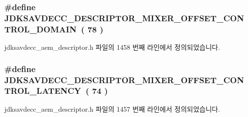 \subsubsection[{\texorpdfstring{J\+D\+K\+S\+A\+V\+D\+E\+C\+C\+\_\+\+D\+E\+S\+C\+R\+I\+P\+T\+O\+R\+\_\+\+M\+I\+X\+E\+R\+\_\+\+O\+F\+F\+S\+E\+T\+\_\+\+C\+O\+N\+T\+R\+O\+L\+\_\+\+D\+O\+M\+A\+IN}{JDKSAVDECC_DESCRIPTOR_MIXER_OFFSET_CONTROL_DOMAIN}}]{\setlength{\rightskip}{0pt plus 5cm}\#define J\+D\+K\+S\+A\+V\+D\+E\+C\+C\+\_\+\+D\+E\+S\+C\+R\+I\+P\+T\+O\+R\+\_\+\+M\+I\+X\+E\+R\+\_\+\+O\+F\+F\+S\+E\+T\+\_\+\+C\+O\+N\+T\+R\+O\+L\+\_\+\+D\+O\+M\+A\+IN~( 78 )}\hypertarget{group__descriptor__mixer_gab0c4900f10973ad3bf6349cea6b6a62e}{}\label{group__descriptor__mixer_gab0c4900f10973ad3bf6349cea6b6a62e}


jdksavdecc\+\_\+aem\+\_\+descriptor.\+h 파일의 1458 번째 라인에서 정의되었습니다.

\subsubsection[{\texorpdfstring{J\+D\+K\+S\+A\+V\+D\+E\+C\+C\+\_\+\+D\+E\+S\+C\+R\+I\+P\+T\+O\+R\+\_\+\+M\+I\+X\+E\+R\+\_\+\+O\+F\+F\+S\+E\+T\+\_\+\+C\+O\+N\+T\+R\+O\+L\+\_\+\+L\+A\+T\+E\+N\+CY}{JDKSAVDECC_DESCRIPTOR_MIXER_OFFSET_CONTROL_LATENCY}}]{\setlength{\rightskip}{0pt plus 5cm}\#define J\+D\+K\+S\+A\+V\+D\+E\+C\+C\+\_\+\+D\+E\+S\+C\+R\+I\+P\+T\+O\+R\+\_\+\+M\+I\+X\+E\+R\+\_\+\+O\+F\+F\+S\+E\+T\+\_\+\+C\+O\+N\+T\+R\+O\+L\+\_\+\+L\+A\+T\+E\+N\+CY~( 74 )}\hypertarget{group__descriptor__mixer_ga83a64a412847aa1f42ea080e9e84d4ab}{}\label{group__descriptor__mixer_ga83a64a412847aa1f42ea080e9e84d4ab}


jdksavdecc\+\_\+aem\+\_\+descriptor.\+h 파일의 1457 번째 라인에서 정의되었습니다.

